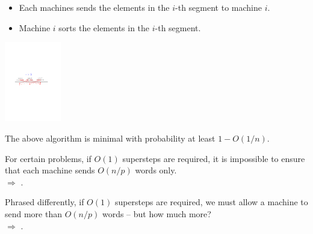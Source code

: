 \documentclass{beamer}
\def\vgap{\vspace{5mm}}
\begin{document}
\begin{frame}
\begin{small}
    
    \vgap 
    
    
    
    \begin{itemize} 
        \item {} Each machines sends the elements in the $i$-th segment to machine $i$. 
        
        \item {} Machine $i$ sorts the elements in the $i$-th segment.
    \end{itemize}

    \begin{center} 
        \includegraphics[height=35mm]{./artwork/tera1} 
    \end{center}
\end{small}
\end{frame}
\begin{frame}
\begin{small}
    
    \vgap 
    
     The above algorithm is minimal with probability at least $1 - O(1/n)$. 
    
    \vgap \vgap 
    
    
\end{small}
\end{frame}
\begin{frame}
\begin{small}
    
    \vgap 
        
    For certain problems, if $O(1)$ supersteps are required, it is impossible to ensure that each machine sends $O(n/p)$ words only. \\
    $\Rightarrow$ . 
    
    
    \vgap \pause
    
    Phrased differently, if $O(1)$ supersteps are required, we must allow a machine to send more than $O(n/p)$ words -- but how much more? \\
    $\Rightarrow$ . 
\end{small}
\end{frame}
\end{document}
